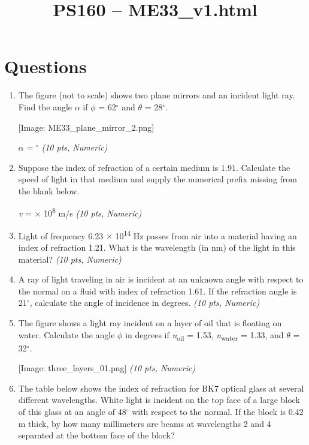 \documentclass[11pt]{article}
\title{PS160 -- ME33\_v1.html}
\date{}
\begin{document}
\maketitle

\section*{Questions}

\begin{enumerate}[leftmargin=*]
  \item The figure (not to scale) shows two plane mirrors and an incident light ray. Find the angle $\alpha$ if $\phi$ = 62$^{\circ}$ and $\theta$ = 28$^{\circ}$.

[Image: ME33\_plane\_mirror\_2.png]

$\alpha$ = $^{\circ}$ \hfill \textit{(10 pts, Numeric)}

  \item Suppose the index of refraction of a certain medium is 1.91. Calculate the speed of light in that medium and supply the numerical prefix missing from the blank below.

\emph{v} = $\times$ 10\textsuperscript{8} m/s \hfill \textit{(10 pts, Numeric)}

  \item Light of frequency 6.23 $\times$ 10\textsuperscript{14} Hz passes from air into a material having an index of refraction 1.21. What is the wavelength (in nm) of the light in this material? \hfill \textit{(10 pts, Numeric)}

  \item A ray of light traveling in air is incident at an unknown angle with respect to the normal on a fluid with index of refraction 1.61. If the refraction angle is 21$^{\circ}$, calculate the angle of incidence in degrees. \hfill \textit{(10 pts, Numeric)}

  \item The figure shows a light ray incident on a layer of oil that is floating on water. Calculate the angle $\phi$ in degrees if \emph{n}\textsubscript{oil} = 1.53, \emph{n}\textsubscript{water} = 1.33, and $\theta$ = 32$^{\circ}$.

[Image: three\_layers\_01.png] \hfill \textit{(10 pts, Numeric)}

  \item The table below shows the index of refraction for BK7 optical glass at several different wavelengths. White light is incident on the top face of a large block of this glass at an angle of 48$^{\circ}$ with respect to the normal. If the block is 0.42 m thick, by how many millimeters are beams at wavelengths 2 and 4 separated at the bottom face of the block?


\end{enumerate}
\end{document}

